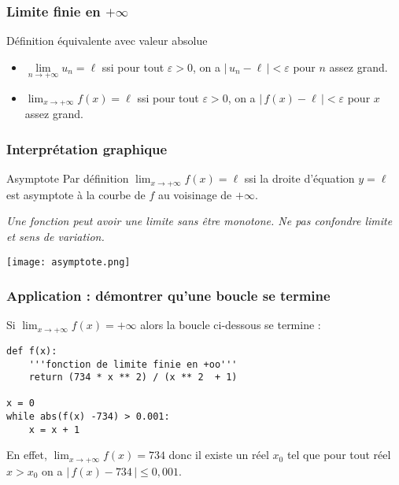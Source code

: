 \documentclass[xcolor=svgnames,t,final]{beamer}
\newcommand{\limitesuite}[1]{\lim\limits
_{n \to +\infty} #1}
\newcommand{\valabs}[1]{\big| \, #1 \, \big|}
\begin{document}
\begin{frame}

\frametitle{Limite finie en $+\infty$}

\begin{block}{Définition équivalente avec valeur absolue}
\begin{itemize}
\pause \item {} 

$\limitesuite{u_{n}}=\ell$ ssi pour tout $\varepsilon>0$,  on a $\valabs{u_{n}-\ell}<\varepsilon$ pour $n$ assez grand.

\pause \item {} 

 $\lim_{x \to +\infty}{f(x)}=\ell$ ssi pour tout $\varepsilon>0$,  on a $\valabs{f(x)-\ell}<\varepsilon$ pour $x$ assez grand.
\end{itemize}
\end{block}

\end{frame}


\begin{frame}

\frametitle{Interprétation graphique}

\begin{block}{Asymptote}
 Par définition $\lim_{x \to +\infty}{f(x)}=\ell$ ssi la droite d'équation $y=\ell$ est asymptote à la courbe de $f$ au voisinage de $+\infty$.
 
{\itshape  \bcattention{} Une fonction peut avoir une limite sans être  monotone. Ne pas confondre limite et sens de variation.}

 \end{block}

\begin{center}
\texttt{[image: asymptote.png]}
\end{center}
\end{frame}





\begin{frame}[fragile]
\frametitle{Application  : démontrer qu'une boucle se termine}
\pause \begin{alertblock}{}
Si $\lim_{x \to +\infty}{f(x)}=+\infty$ alors la boucle ci-dessous se termine :

\medskip

\begin{lstlisting}[style=rond]
def f(x):
	'''fonction de limite finie en +oo'''
	return (734 * x ** 2) / (x ** 2  + 1)
	
x = 0
while abs(f(x) -734) > 0.001:
	x = x + 1
\end{lstlisting}

\end{alertblock}

\pause En effet,  $\lim_{x \to +\infty}{f(x)}=734$ donc il existe un réel $x_{0}$ tel que pour tout réel $x >x_{0}$ on a $\valabs{f(x)-734} \leqslant 0,001$.

\end{frame}
\end{document}
